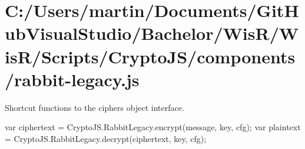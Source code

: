 \hypertarget{_c_1_2_users_2martin_2_documents_2_git_hub_visual_studio_2_bachelor_2_wis_r_2_wis_r_2_scripts_2_3d4b76b531bc45958a77b0fd11af6022}{}\section{C\+:/\+Users/martin/\+Documents/\+Git\+Hub\+Visual\+Studio/\+Bachelor/\+Wis\+R/\+Wis\+R/\+Scripts/\+Crypto\+J\+S/components/rabbit-\/legacy.\+js}
Shortcut functions to the cipher\textquotesingle{}s object interface.

\begin{DoxyVerb}var ciphertext = CryptoJS.RabbitLegacy.encrypt(message, key, cfg);
var plaintext  = CryptoJS.RabbitLegacy.decrypt(ciphertext, key, cfg);\end{DoxyVerb}



